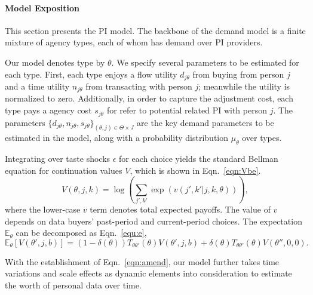 \documentclass{mcmthesis}
\begin{document}
\paragraph{Model Exposition} This section presents the PI model. The backbone of the demand model is a finite mixture of agency types, each of whom has demand over PI providers.

Our model denotes type by $\theta$. We specify several parameters to be estimated for each type. First, each type enjoys a flow utility $d_{j\theta}$ from buying from person $j$ and a time utility $n_{j\theta}$ from transacting with person $j$; meanwhile the utility is normalized to zero. Additionally, in order to capture the adjustment cost, each type pays a agency cost $s_{j\theta}$ for refer to potential related PI with person $j$. The parameters $\{d_{j\theta}, n_{j\theta}, s_{j\theta}\}_{(\theta,j)\in\Theta\times J}$ are the key demand parameters to be estimated in the model, along with a probability distribution $\mu_\theta$ over types.

Integrating over taste shocks $\epsilon$ for each choice yields the standard Bellman equation for continuation values $V$, which is shown in Eqn.~\eqref{eqn:Vbe}.
\begin{equation}
V(\theta,j,k)=\log\left(\sum_{j',k'}\exp(v(j',k'|j,k,\theta))\right),\label{eqn:Vbe}
\end{equation}
where the lower-case $v$ term denotes total expected payoffs. The value of $v$ depends on data buyers' past-period and current-period choices. The expectation $\mathbb{E}_\theta$ can be decomposed as Eqn.~\eqref{equ:e},
\begin{equation}\label{equ:e}
\mathbb{E}_\theta[V(\theta',j,b)]=(1-\delta(\theta))T_{\theta\theta'}(\theta)V(\theta',j,b)+\delta(\theta)T_{\theta\theta'}(\theta)V(\theta'',0,0).
\end{equation}

With the establishment of Eqn.~\eqref{eqn:amend}, our model further takes time variations and scale effects as dynamic elements into consideration to estimate the worth of personal data over time.

\end{document}
